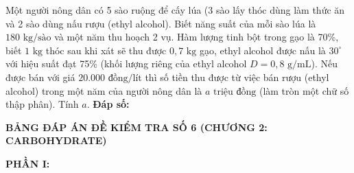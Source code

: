 \documentclass[12pt,a4paper]{article}
\begin{document}
\begin{ex}
Một người nông dân có 5 sào ruộng để cấy lúa (3 sào lấy thóc dùng làm thức ăn và 2 sào dùng nấu rượu (ethyl alcohol). Biết năng suất của mỗi sào lúa là $180\text{ kg/sào}$ và một năm thu hoạch 2 vụ. Hàm lượng tinh bột trong gạo là 70\%, biết $1\text{ kg}$ thóc sau khi xát sẽ thu được $0{,}7\text{ kg}$ gạo, ethyl alcohol được nấu là $30^\circ$ với hiệu suất đạt 75\% (khối lượng riêng của ethyl alcohol $D = 0{,}8\text{ g/mL}$). Nếu được bán với giá $20.000\text{ đồng/lít}$ thì số tiền thu được từ việc bán rượu (ethyl alcohol) trong một năm của người nông dân là $a\text{ triệu đồng}$ (làm tròn một chữ số thập phân). Tính $a$.
\noindent\textbf{Đáp số: \color{hfRed}{12,5}}
\end{ex}


\newpage
\noindent
{\color{hfRed}\textbf{\Large BẢNG ĐÁP ÁN ĐỀ KIỂM TRA SỐ 6 (CHƯƠNG 2: CARBOHYDRATE)}}

\vspace{0.3cm}
\noindent\textbf{PHẦN I:}
\begin{center}

\end{center}
\end{document}
